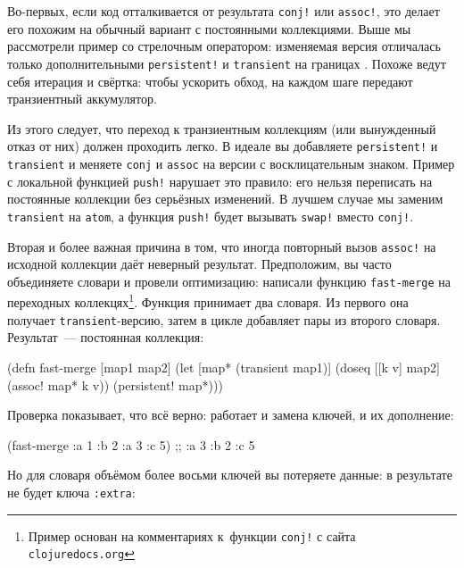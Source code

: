 Во-первых, если код отталкивается от результата \verb|conj!| или \verb|assoc!|,
это делает его похожим на обычный вариант с постоянными коллекциями. Выше мы
рассмотрели пример со стрелочным оператором: изменяемая версия отличалась только
дополнительными \verb|persistent!| и \verb|transient| на
границах . Похоже ведут себя итерация и свёртка: чтобы
ускорить обход, на каждом шаге передают транзиентный аккумулятор.

Из этого следует, что переход к транзиентным коллекциям (или вынужденный отказ
от них) должен проходить легко. В идеале вы добавляете \verb|persistent!| и
\verb|transient| и меняете \verb|conj| и \verb|assoc| на версии с
восклицательным знаком. Пример с локальной функцией \verb|push!| нарушает это
правило: его нельзя переписать на постоянные коллекции без серьёзных
изменений. В лучшем случае мы заменим \verb|transient| на \verb|atom|, а функция
\verb|push!| будет вызывать \verb|swap!| вместо \verb|conj!|.

Вторая и более важная причина в том, что иногда повторный вызов \verb|assoc!| на
исходной коллекции даёт неверный результат. Предположим, вы часто объединяете
словари и провели оптимизацию: написали функцию \verb|fast-merge| на переходных
коллекцях\footnote{Пример основан на комментариях к~функции \texttt{conj!} с
  сайта \texttt{clo\-ju\-re\-docs.org}}. Функция принимает два словаря. Из
первого она получает \verb|transient|-версию, затем в цикле добавляет пары из
второго словаря. Результат~--- постоянная коллекция:

\begin{english}
  \begin{clojure}
(defn fast-merge [map1 map2]
  (let [map* (transient map1)]
    (doseq [[k v] map2]
      (assoc! map* k v))
    (persistent! map*)))
  \end{clojure}
\end{english}

Проверка показывает, что всё верно: работает и замена ключей, и их дополнение:

\begin{english}
  \begin{clojure}
(fast-merge {:a 1 :b 2} {:a 3 :c 5})
;; {:a 3 :b 2 :c 5}
  \end{clojure}
\end{english}

Но для словаря объёмом более восьми ключей вы потеряете данные: в результате не
будет ключа \verb|:extra|:


